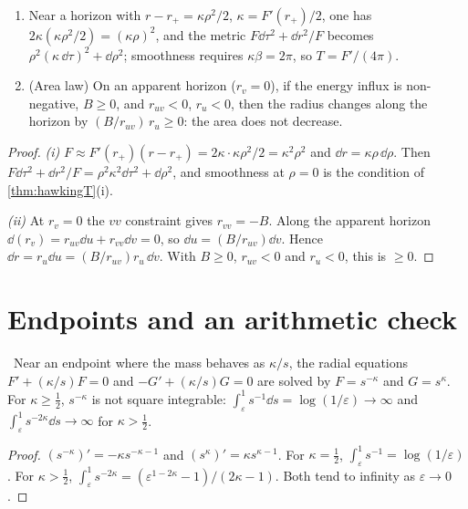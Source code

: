 \begin{proposition}\label{prop:secondlaw}\ver\
\begin{enumerate}[label=(\roman*)]
\item Near a horizon with $r-r_+=\kappa\rho^2/2$, $\kappa=F'(r_+)/2$, one has $2\kappa(\kappa\rho^2/2)=(\kappa\rho)^2$, and the metric $F\dd\tau^2+\dd r^2/F$ becomes $\rho^2(\kappa\,\dd\tau)^2+\dd\rho^2$; smoothness requires $\kappa\beta=2\pi$, so $T=F'/(4\pi)$.
\item (Area law) On an apparent horizon ($r_v=0$), if the energy influx is non-negative, $B\ge0$, and $r_{uv}<0$, $r_u<0$, then the radius changes along the horizon by $(B/r_{uv})\,r_u\ge0$: the area does not decrease.
\end{enumerate}
\end{proposition}
\begin{proof}
\emph{(i)} $F\approx F'(r_+)(r-r_+)=2\kappa\cdot\kappa\rho^2/2=\kappa^2\rho^2$ and $\dd r=\kappa\rho\,\dd\rho$. Then $F\dd\tau^2+\dd r^2/F=\rho^2\kappa^2\dd\tau^2+\dd\rho^2$, and smoothness at $\rho=0$ is the condition of \cref{thm:hawkingT}(i).

\emph{(ii)} At $r_v=0$ the $vv$ constraint gives $r_{vv}=-B$. Along the apparent horizon $\dd(r_v)=r_{uv}\dd u+r_{vv}\dd v=0$, so $\dd u=(B/r_{uv})\dd v$. Hence $\dd r=r_u\dd u=(B/r_{uv})r_u\,\dd v$. With $B\ge0$, $r_{uv}<0$ and $r_u<0$, this is $\ge0$.
\end{proof}


\section{Endpoints and an arithmetic check}

\begin{proposition}[Behaviour at an endpoint]\label{prop:endpoint}\ver\
Near an endpoint where the mass behaves as $\kappa/s$, the radial equations $F'+(\kappa/s)F=0$ and $-G'+(\kappa/s)G=0$ are solved by $F=s^{-\kappa}$ and $G=s^\kappa$. For $\kappa\ge\frac12$, $s^{-\kappa}$ is not square integrable: $\int_\varepsilon^1s^{-1}\dd s=\log(1/\varepsilon)\to\infty$ and $\int_\varepsilon^1s^{-2\kappa}\dd s\to\infty$ for $\kappa>\frac12$.
\end{proposition}
\begin{proof}
$(s^{-\kappa})'=-\kappa s^{-\kappa-1}$ and $(s^\kappa)'=\kappa s^{\kappa-1}$. For $\kappa=\frac12$, $\int_\varepsilon^1s^{-1}=\log(1/\varepsilon)$. For $\kappa>\frac12$, $\int_\varepsilon^1s^{-2\kappa}=(\varepsilon^{1-2\kappa}-1)/(2\kappa-1)$. Both tend to infinity as $\varepsilon\to0$.
\end{proof}


